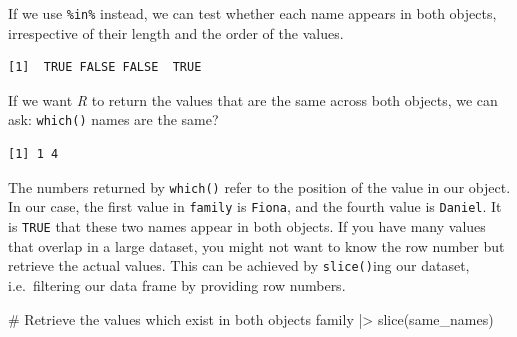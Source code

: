\documentclass[
  letterpaper,
]{krantz}
\makeatletter
\newenvironment{Shaded}{\begin{snugshade}}{\end{snugshade}}
\newcommand{\CommentTok}[1]{\textcolor[rgb]{0.37,0.37,0.37}{#1}}
\newcommand{\FunctionTok}[1]{\textcolor[rgb]{0.28,0.35,0.67}{#1}}
\newcommand{\NormalTok}[1]{\textcolor[rgb]{0.00,0.23,0.31}{#1}}
\newcommand{\OtherTok}[1]{\textcolor[rgb]{0.00,0.23,0.31}{#1}}
\newcommand{\SpecialCharTok}[1]{\textcolor[rgb]{0.37,0.37,0.37}{#1}}
\newenvironment{kframe}{%
\medskip{}
\setlength{\fboxsep}{.8em}
 \def\at@end@of@kframe{}%
 \ifinner\ifhmode%
  \def\at@end@of@kframe{\end{minipage}}%
  \begin{minipage}{\columnwidth}%
 \fi\fi%
 \def\FrameCommand##1{\hskip\@totalleftmargin \hskip-\fboxsep
 \colorbox{shadecolor}{##1}\hskip-\fboxsep
     \hskip-\linewidth \hskip-\@totalleftmargin \hskip\columnwidth}%
 \MakeFramed {\advance\hsize-\width
   \@totalleftmargin\z@ \linewidth\hsize
   \@setminipage}}%
 {\par\unskip\endMakeFramed%
 \at@end@of@kframe}
\renewenvironment{Shaded}{\begin{kframe}}{\end{kframe}}
\makeatother
\begin{document}
If we use \texttt{\%in\%} instead, we can test whether each name appears
in both objects, irrespective of their length and the order of the
values.

\begin{Shaded}
\end{Shaded}

\begin{verbatim}
[1]  TRUE FALSE FALSE  TRUE
\end{verbatim}

If we want \emph{R} to return the values that are the same across both
objects, we can ask: \texttt{which()} names are the same?

\begin{Shaded}
\end{Shaded}

\begin{verbatim}
[1] 1 4
\end{verbatim}

The numbers returned by \texttt{which()} refer to the position of the
value in our object. In our case, the first value in \texttt{family} is
\texttt{Fiona}, and the fourth value is \texttt{Daniel}. It is
\texttt{TRUE} that these two names appear in both objects. If you have
many values that overlap in a large dataset, you might not want to know
the row number but retrieve the actual values. This can be achieved by
\texttt{slice()}ing our dataset, i.e.~filtering our data frame by
providing row numbers.

\begin{Shaded}
\begin{Highlighting}[]
\CommentTok{\# Retrieve the values which exist in both objects}
\NormalTok{family }\SpecialCharTok{|\textgreater{}}
  \FunctionTok{slice}\NormalTok{(same\_names)}
\end{Highlighting}
\end{Shaded}
\end{document}
